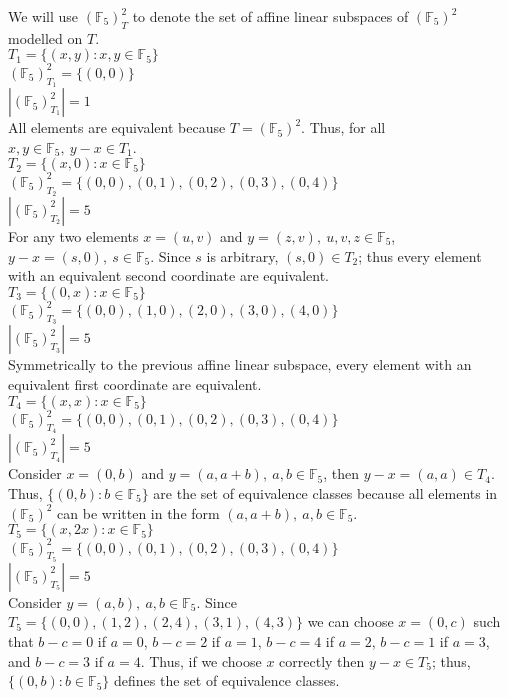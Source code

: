 \documentclass[11pt]{article}
\begin{document}
\begin{flushleft}
We will use $(\mathbb{F}_5)^2_T$ to denote the set of affine linear subspaces of $(\mathbb{F}_5)^2$ modelled on $T$. \\
\bigskip
$T_1 = \{ (x,y): x,y \in \mathbb{F}_5 \}$ \\
$(\mathbb{F}_5)^2_{T_1} = \{ (0,0) \}$ \\
$|(\mathbb{F}_5)^2_{T_1}| = 1$ \\
All elements are equivalent because $T = (\mathbb{F}_5)^2$. Thus, for all $x,y \in \mathbb{F}_5, \ y -x \in T_1$. \\
\bigskip
$T_2 = \{ (x, 0): x \in \mathbb{F}_5 \}$ \\
$(\mathbb{F}_5)^2_{T_2} = \{ (0,0), (0,1), (0,2), (0,3), (0,4) \}$ \\
$|(\mathbb{F}_5)^2_{T_2}| = 5$ \\
For any two elements $x=(u, v)$ and $y=(z, v), \ u,v,z \in \mathbb{F}_5$, $y - x = (s, 0), \ s \in \mathbb{F}_5$. Since $s$ is arbitrary, $(s, 0) \in T_2$; thus every element with an equivalent second coordinate are equivalent. \\
\bigskip
$T_3 = \{ (0, x): x \in \mathbb{F}_5 \}$ \\
$(\mathbb{F}_5)^2_{T_3} = \{ (0,0), (1,0), (2,0), (3,0), (4,0) \}$ \\
$|(\mathbb{F}_5)^2_{T_3}| = 5$ \\
Symmetrically to the previous affine linear subspace, every element with an equivalent first coordinate are equivalent. \\
\bigskip
$T_4 = \{ (x,x): x \in \mathbb{F}_5 \}$ \\
$(\mathbb{F}_5)^2_{T_4} = \{ (0,0), (0,1), (0,2), (0,3), (0,4) \}$ \\
$|(\mathbb{F}_5)^2_{T_4}| = 5$ \\
Consider $x = (0, b)$ and $y = (a, a + b), \ a,b \in \mathbb{F}_5$, then $y - x = (a,a) \in T_4$. Thus, $\{ (0,b): b \in \mathbb{F}_5 \}$ are the set of equivalence classes because all elements in $(\mathbb{F}_5)^2$ can be written in the form $(a, a +b), \ a,b \in \mathbb{F}_5$. \\
\bigskip
$T_5 = \{ (x,2x): x \in \mathbb{F}_5 \}$ \\
$(\mathbb{F}_5)^2_{T_5} = \{ (0,0), (0,1), (0,2), (0,3), (0,4) \}$ \\
$|(\mathbb{F}_5)^2_{T_5}| = 5$ \\
Consider $y = (a, b), \ a,b \in \mathbb{F}_5$. Since $T_5 = \{ (0,0), (1,2), (2,4), (3,1), (4,3) \}$ we can choose $x = (0, c)$ such that $b - c = 0$ if $a = 0$, $b - c = 2$ if $a = 1$, $b - c = 4$ if $a = 2$, $b - c = 1$ if $a = 3$, and $b - c = 3$ if $a = 4$. Thus, if we choose $x$ correctly then $y - x \in T_5$; thus, $\{ (0,b): b \in \mathbb{F}_5 \}$ defines the set of equivalence classes. \\

\end{flushleft}
\end{document}
